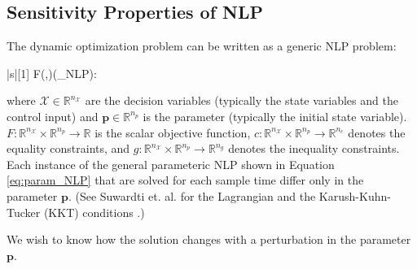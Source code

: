 \subsection{Sensitivity Properties of NLP}
The dynamic optimization problem can be written as a generic NLP problem:
\begin{mini!}|s|[1]
	{}{F(,)}{\label{eq:param_NLP}}{(_{NLP}):}
\end{mini!}
where $\mathcal{X}\in\mathbb{R}^{n_\mathcal{X}}$ are the decision variables (typically the state variables and the control input) and $\boldsymbol{p}\in\mathbb{R}^{n_p}$ is the parameter (typically the initial state variable).
$F:\mathbb{R}^{n_\mathcal{X}}\times \mathbb{R}^{n_p}\rightarrow\mathbb{R}$  is the scalar objective function, $c:\mathbb{R}^{n_\mathcal{X}}\times \mathbb{R}^{n_p}\rightarrow\mathbb{R}^{n_c}$ denotes the equality constraints, and $g:\mathbb{R}^{n_\mathcal{X}}\times \mathbb{R}^{n_p}\rightarrow\mathbb{R}^{n_g}$ denotes the inequality constraints.
Each instance of the general parameteric NLP shown in Equation \ref{eq:param_NLP} that are solved for each sample time differ only in the parameter $\boldsymbol{p}$.
(See Suwardti et. al. for the Lagrangian and the Karush-Kuhn-Tucker (KKT) conditions \cite{economic}.)
\par
We wish to know how the solution changes with a perturbation in the parameter $\boldsymbol{p}$.

